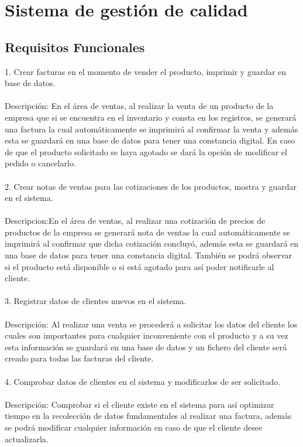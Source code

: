 \documentclass[12pt,a4paper]{article}
\begin{document}
\section{Sistema de gestión de calidad}\textbf{}
\subsection{Requisitos Funcionales}
1.	Crear facturas en el momento de vender el producto, imprimir y guardar en base de datos.\\\\
Descripción: En el área de ventas, al realizar la venta de un producto de la empresa que si se encuentra en el inventario y consta en los registros, se generará una factura la cual automáticamente se imprimirá al confirmar la venta y además esta se guardará en una base de datos para tener una constancia digital.
En caso de que el producto solicitado se haya agotado se dará la opción de modificar el pedido o cancelarlo. 
\\\\
2.	Crear notas de ventas para las cotizaciones de los productos, mostra y guardar en el sistema.\\\\
Descripcion:En el área de ventas, al realizar una cotización de precios de productos de la empresa se generará nota de ventas la cual automáticamente se imprimirá al confirmar que dicha cotización concluyó, además esta se guardará en una base de datos para tener una constancia digital.
También se podrá observar si el producto está disponible o si está agotado para así poder notificarle al cliente.
\\\\
3.	Registrar datos de clientes nuevos en el sistema.\\\\
Descripción: Al realizar una venta se procederá a solicitar los datos del cliente los cuales son importantes para cualquier inconveniente con el producto y a su vez esta información se guardará en una base de datos y un fichero del cliente será creado para todas las facturas del cliente.
\\\\
4.	Comprobar datos de clientes en el sistema y modificarlos de ser solicitado.\\\\
Descripción: Comprobar si el cliente existe en el sistema para así optimizar tiempo en la recolección de datos fundamentales al realizar una factura, además se podrá modificar cualquier información en caso de que el cliente desee actualizarla.
\end{document}
